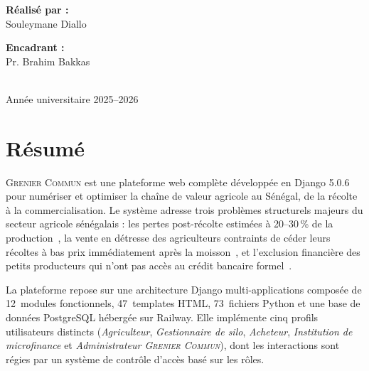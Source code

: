 \documentclass[12pt,a4paper,twoside]{report}
\newcommand{\gc}{\textsc{Grenier Commun}}
\begin{document}
\begin{titlepage}

\vfill

\noindent
\begin{minipage}[t]{0.48\textwidth}
  \raggedright
  {\large\bfseries Réalisé par :}\\[0.5cm]
  {\Large Souleymane Diallo}
\end{minipage}%
\hfill
\begin{minipage}[t]{0.48\textwidth}
  \raggedleft
  {\large\bfseries Encadrant :}\\[0.5cm]
  {\Large Pr. Brahim Bakkas}
\end{minipage}

\vspace{0.8cm}
\\[0.2cm]
{\small Année universitaire 2025--2026}
\end{titlepage}

\chapter*{Résumé}

\gc{} est une plateforme web complète développée en Django 5.0.6 pour numériser et
optimiser la chaîne de valeur agricole au Sénégal, de la récolte à la commercialisation.
Le système adresse trois problèmes structurels majeurs du secteur agricole sénégalais :
les pertes post-récolte estimées à 20--30\,\% de la production~\cite{fao2019postharvest},
la vente en détresse des agriculteurs contraints de céder leurs récoltes à bas prix
immédiatement après la moisson~\cite{jayne2010distress}, et l'exclusion financière des
petits producteurs qui n'ont pas accès au crédit bancaire formel~\cite{worldbank2022senegal}.

La plateforme repose sur une architecture Django multi-applications composée de
12~modules fonctionnels, 47~templates HTML, 73~fichiers Python et une base de données
PostgreSQL hébergée sur Railway. Elle implémente cinq profils utilisateurs distincts (\emph{Agriculteur}, \emph{Gestionnaire de silo},
\emph{Acheteur}, \emph{Institution de microfinance} et \emph{Administrateur \gc{}}),
dont les interactions sont régies par un système de contrôle d'accès basé sur les rôles.
\end{document}
